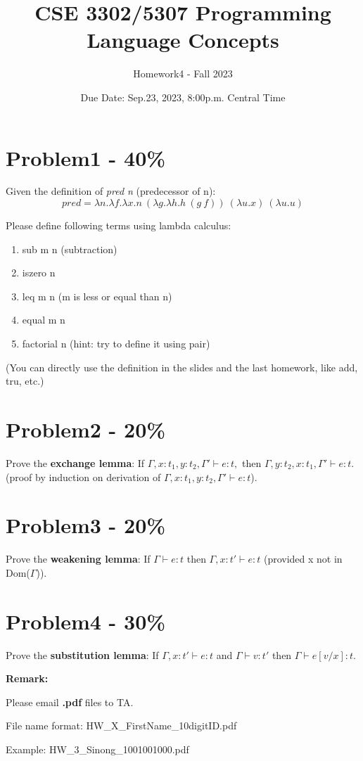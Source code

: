 \documentclass{article}
\begin{document}
\title{CSE 3302/5307 Programming Language Concepts}
\author{Homework4 - Fall 2023}
\date{Due Date: Sep.23, 2023, 8:00p.m. Central Time}
\maketitle
\thispagestyle{fancy}


\section*{Problem1 - 40\%}

Given the definition of \textit{pred n} (predecessor of n):
\[pred = \lambda n.\lambda f.\lambda x.n\ (\lambda g.\lambda h.h\ (g\ f))\ (\lambda u.x)\ (\lambda u.u)\]    

Please define following terms using lambda calculus:

\begin{enumerate}
    \item sub m n (subtraction)
    \item iszero n
    \item leq m n (m is less or equal than n)
    \item equal m n
    \item factorial n (hint: try to define it using pair)
\end{enumerate}
(You can directly use the definition in the slides and the last homework, like add, tru, etc.)


\section*{Problem2 - 20\%}

Prove the \textbf{exchange lemma}: If $\Gamma, x:t_1,y:t_2, \Gamma'\vdash e:t, $ then $\Gamma, y:t_2, x:t_1, \Gamma' \vdash e:t.$ (proof by induction on derivation of $\Gamma, x:t_1, y:t_2, \Gamma' \vdash e:t$).


\section*{Problem3 - 20\%}

Prove the \textbf{weakening lemma}: If $\Gamma \vdash e:t$ then $\Gamma,x:t' \vdash e:t$ (provided x not in Dom($\Gamma$)).


\section*{Problem4 - 30\%}

Prove the \textbf{substitution lemma}: If $\Gamma,x:t' \vdash e:t$ and $\Gamma \vdash v:t'$ then $\Gamma \vdash e[v/x]:t$.


\textbf{Remark:} 

Please email \textbf{.pdf} files to TA.

File name format: {\color{red} HW\_X\_FirstName\_10digitID.pdf}

Example: {HW\_3\_Sinong\_1001001000.pdf}
\end{document}
